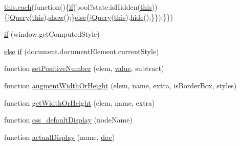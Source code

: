 \begin{DoxyCompactItemize}
\hyperlink{fullpage_2plugin_8min_8js_a536422939f8cd6b5867a8fb424c3c02e}{this.\+each}(function()\{\hyperlink{fullpage_2plugin_8js_a8b98017e64ef036adb9ae327ff94abe1}{if}(bool?state\+:is\+Hidden(\hyperlink{tinymce_8jquery_8dev_8js_a05c09a5e9d53fa7adf0a7936038c2fa3}{this}))\{\hyperlink{_site_bundle_2_resources_2public_2js_2_specific_functions_8js_ada154f66b5b2b806f5e239376e925644}{j\+Query}(\hyperlink{tinymce_8jquery_8dev_8js_a05c09a5e9d53fa7adf0a7936038c2fa3}{this}).\hyperlink{jquery_8tooltip_8js_aa8d9f2083cafa2af98efafed94901079}{show}();\}\hyperlink{jquery_8iframe-transport_8js_a0544c3fe466e421738dae463968b70ba}{else}\{\hyperlink{_site_bundle_2_resources_2public_2js_2_specific_functions_8js_ada154f66b5b2b806f5e239376e925644}{j\+Query}(\hyperlink{tinymce_8jquery_8dev_8js_a05c09a5e9d53fa7adf0a7936038c2fa3}{this}).\hyperlink{jquery_8tooltip_8js_af74dd80504a76d14389d6c8c02f3aa0e}{hide}();\}\});\}\})
\item 
\hyperlink{jquery-1_89_81_8js_add3620f254b483a46b557fde577ecbf7}{if} (window.\+get\+Computed\+Style)
\item 
\hyperlink{jquery_8iframe-transport_8js_a0544c3fe466e421738dae463968b70ba}{else} \hyperlink{jquery-1_89_81_8js_ac118b48e1947a1d7c85fefbdad49502e}{if} (document.\+document\+Element.\+current\+Style)
\item 
function \hyperlink{jquery-1_89_81_8js_a049182834e8b4b2d7485cd919ed272d7}{set\+Positive\+Number} (elem, \hyperlink{fullpage_2plugin_8min_8js_ac56c57897e10f699d124e0103921aa20}{value}, subtract)
\item 
function \hyperlink{jquery-1_89_81_8js_aacaac1f0b5ea53030522e6f5b227ce51}{augment\+Width\+Or\+Height} (elem, name, extra, is\+Border\+Box, styles)
\item 
function \hyperlink{jquery-1_89_81_8js_a6520fbbeac78eeb0f519393470dc873b}{get\+Width\+Or\+Height} (elem, name, extra)
\item 
function \hyperlink{jquery-1_89_81_8js_a90f91be23732240774f2a323d500c78a}{css\+\_\+default\+Display} (node\+Name)
\item 
function \hyperlink{jquery-1_89_81_8js_a88bc5a80e40ccc594ece17ae5772d5d3}{actual\+Display} (name, \hyperlink{outside_events_8js_a6966a4bf23931ad4f323b1b8c1e1801f}{doc})
\item 

\end{DoxyCompactItemize}

